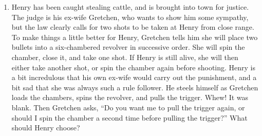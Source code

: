 \documentclass[12pt]{article}
\begin{document}
\begin{enumerate}[1.]
\item Henry has been caught stealing cattle, and is brought into town for
  justice. The judge is his ex-wife Gretchen, who wants to show him some
  sympathy, but the law clearly calls for two shots to be taken at Henry from
  close range. To make things a little better for Henry, Gretchen tells him she
  will place two bullets into a six-chambered revolver in successive order. She
  will spin the chamber, close it, and take one shot. If Henry is still alive,
  she will then either take another shot, or spin the chamber again before
  shooting. Henry is a bit incredulous that his own ex-wife would carry out the
  punishment, and a bit sad that she was always such a rule follower. He steels
  himself as Gretchen loads the chambers, spins the revolver, and pulls the
  trigger. Whew! It was blank. Then Gretchen asks, ``Do you want me to pull the
  trigger again, or should I spin the chamber a second time before pulling the
  trigger?'' What should Henry choose?
  

\end{enumerate}
\end{document}
